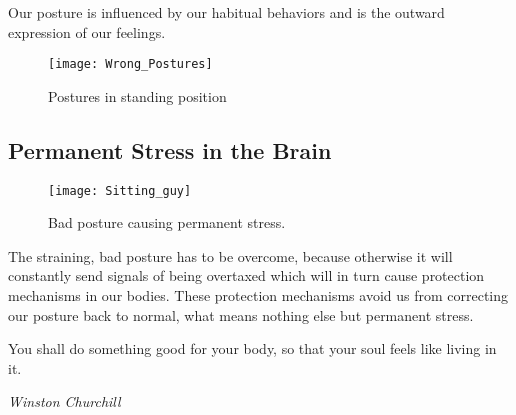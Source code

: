 \documentclass[../main.tex]{subfiles}
\begin{document}
Our posture is influenced by our habitual behaviors and is the outward expression of our feelings.
\begin{figure}[h!]
  \centering
  \texttt{[image: Wrong\_Postures]}
  \caption{Postures in standing position~\cite{Haltung}}
\end{figure}
\newpage

\subsection{Permanent Stress in the Brain}

\begin{figure}[h!]
  \centering
  \texttt{[image: Sitting\_guy]}
  \caption{Bad posture causing permanent stress.~\cite{Haltung}}
\end{figure}

The straining, bad posture has to be overcome, because otherwise it will constantly send signals of being overtaxed which will in turn cause protection mechanisms in our bodies.
These protection mechanisms avoid us from correcting our posture back to normal, what means nothing else but permanent stress.

\epigraph{You shall do something good for your body, so that your soul feels like living in it.}{\textit{Winston Churchill}}
  
\end{document}
